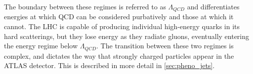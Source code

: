 The boundary between these regimes is referred to as $\Lambda_{QCD}$ and differentiates energies at which \ac{QCD} can be considered purbatively and those at which it cannot. The \ac{LHC} is capable of producing individual high-energy quarks in its hard scatterings, but they lose energy as they radiate gluons, eventually entering the energy regime below $\Lambda_{QCD}$. The transition between these two regimes is complex, and dictates the way that strongly charged particles appear in the \ac{ATLAS} detector. This is described in more detail in \autoref{sec:pheno_jets}.









